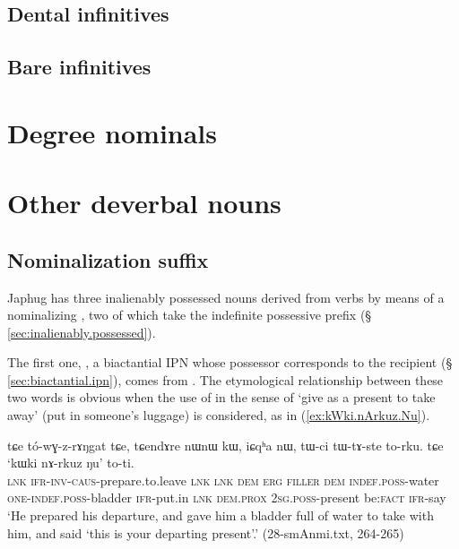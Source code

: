\subsection{Dental infinitives} \label{sec:dental.inf}
\subsection{Bare infinitives} \label{sec:bare.inf}
\section{Degree nominals} \label{sec:degree.nominals}

\section{Other deverbal nouns}

\subsection{Nominalization  suffix} \label{sec:z.nmlz}
Japhug has three inalienably possessed nouns derived from verbs by means of a nominalizing , two of which take the indefinite possessive prefix  (§ \ref{sec:inalienably.possessed}).

The first one, , a biactantial IPN whose possessor corresponds to the recipient (§ \ref{sec:biactantial.ipn}), comes from . The etymological relationship  between these two words is obvious when the use of   in the sense of `give as a present to take away' (put in someone's luggage) is considered, as in (\ref{ex:kWki.nArkuz.Nu}).

\begin{exe}
\ex \label{ex:kWki.nArkuz.Nu}
\gll tɕe tó-wɣ-z-rɤŋgat tɕe, tɕendɤre nɯnɯ kɯ, iɕqʰa nɯ,  tɯ-ci tɯ-tɤ-ste to-rku. tɕe `kɯki nɤ-rkuz ŋu' to-ti. \\
\textsc{lnk} \textsc{ifr}-\textsc{inv}-\textsc{caus}-prepare.to.leave \textsc{lnk} \textsc{lnk} \textsc{dem} \textsc{erg} \textsc{filler} \textsc{dem} \textsc{indef}.\textsc{poss}-water \textsc{one}-\textsc{indef}.\textsc{poss}-bladder \textsc{ifr}-put.in \textsc{lnk} \textsc{dem}.\textsc{prox} \textsc{2sg}.\textsc{poss}-present be:\textsc{fact} \textsc{ifr}-say \\
\glt `He prepared his departure, and gave him a bladder full of water to take with him, and said `this is your departing present'.' (28-smAnmi.txt, 264-265)
\end{exe}


